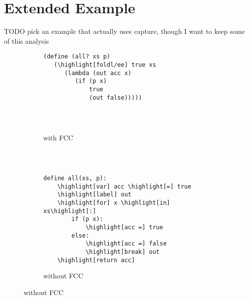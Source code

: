 \documentclass[11pt]{article}
\newcommand{\highlight}[1]{\colorbox{black!30!white}{#1}}
\newcommand\F{\mathcal{F}}
\newcommand{\angles}[1]{\langle#1\rangle}
\begin{document}























\section{Extended Example}
\label{sec:foldl/ee}

TODO pick an example that actually uses capture, though I want to keep some of this analysis

\begin{figure}[H]
\caption{Accumulation-loop pattern codified}
\label{fig:foldl/ee}


\begin{subfigure}[b]{0.5\textwidth}
\begin{Verbatim}[commandchars=\\\[\]]
(define (all? xs p)
   (\highlight[foldl/ee] true xs
      (lambda (out acc x)
         (if (p x)
             true
             (out false)))))




\end{Verbatim}
\caption{with FCC}
\end{subfigure}
~
\begin{subfigure}[b]{0.5\textwidth}
\begin{Verbatim}[commandchars=\\\[\]]

define all(xs, p):
    \highlight[var] acc \highlight[=] true
    \highlight[label] out
    \highlight[for] x \highlight[in] xs\highlight[:]
        if (p x):
            \highlight[acc =] true
        else:
            \highlight[acc =] false
            \highlight[break] out
    \highlight[return acc]
\end{Verbatim}
\caption{without FCC}
\end{subfigure}


\end{figure}
\end{document}
